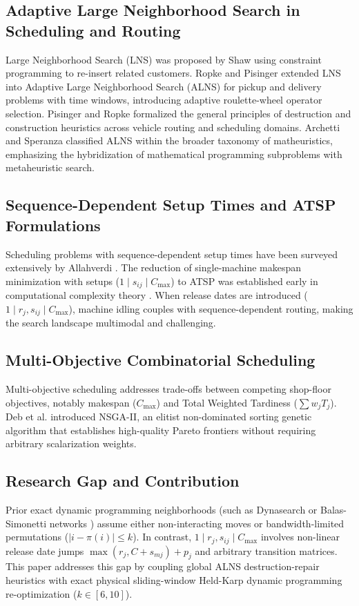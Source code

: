 \documentclass[journal]{IEEEtran}
\begin{document}
\subsection{Adaptive Large Neighborhood Search in Scheduling and Routing}
Large Neighborhood Search (LNS) was proposed by Shaw \cite{shaw1998using} using constraint programming to re-insert related customers. Ropke and Pisinger \cite{ropke2006adaptive} extended LNS into Adaptive Large Neighborhood Search (ALNS) for pickup and delivery problems with time windows, introducing adaptive roulette-wheel operator selection. Pisinger and Ropke \cite{pisinger2010large} formalized the general principles of destruction and construction heuristics across vehicle routing and scheduling domains. Archetti and Speranza \cite{archetti2014survey} classified ALNS within the broader taxonomy of matheuristics, emphasizing the hybridization of mathematical programming subproblems with metaheuristic search.

\subsection{Sequence-Dependent Setup Times and ATSP Formulations}
Scheduling problems with sequence-dependent setup times have been surveyed extensively by Allahverdi \cite{allahverdi2015third}. The reduction of single-machine makespan minimization with setups ($1 \mid s_{ij} \mid C_{\max}$) to ATSP was established early in computational complexity theory \cite{garey1979computers}. When release dates are introduced ($1 \mid r_j, s_{ij} \mid C_{\max}$), machine idling couples with sequence-dependent routing, making the search landscape multimodal and challenging.

\subsection{Multi-Objective Combinatorial Scheduling}
Multi-objective scheduling addresses trade-offs between competing shop-floor objectives, notably makespan ($C_{\max}$) and Total Weighted Tardiness ($\sum w_j T_j$). Deb et al. \cite{deb2002fast} introduced NSGA-II, an elitist non-dominated sorting genetic algorithm that establishes high-quality Pareto frontiers without requiring arbitrary scalarization weights.

\subsection{Research Gap and Contribution}
Prior exact dynamic programming neighborhoods (such as Dynasearch \cite{congram2002iterated, sourd2006dynasearch} or Balas-Simonetti networks \cite{balas2001linear}) assume either non-interacting moves or bandwidth-limited permutations ($|i - \pi(i)| \le k$). In contrast, $1 \mid r_j, s_{ij} \mid C_{\max}$ involves non-linear release date jumps $\max(r_j, C + s_{mj}) + p_j$ and arbitrary transition matrices. This paper addresses this gap by coupling global ALNS destruction-repair heuristics with exact physical sliding-window Held-Karp dynamic programming re-optimization ($k \in [6, 10]$).
\end{document}
